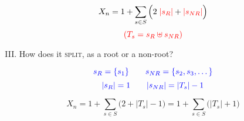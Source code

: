 
\begin{frame}{}
  \[
    X_{n} = 1 + \sum_{s \in S} \Big( 2\; \textcolor{red}{|s_{R}|} + \textcolor{red}{|s_{NR}|} \Big)
  \]
  \[
    \textcolor{red}{(T_{s} = s_{R} \uplus s_{NR})}
  \]

  \begin{enumerate}[(I)]
    \setcounter{enumi}{2}
    \centering
    \item How does it \textsc{split}, as a root or a non-root?
  \end{enumerate}

  \pause
  \[
    \textcolor{blue}{s_{R} = \{s_{1}\} \qquad s_{NR} = \{s_{2}, s_{3}, \dots\}}
  \]
  \[
    \textcolor{blue}{|s_{R}| = 1 \qquad |s_{NR}| = |T_{s}| - 1}
  \]

  \pause
  \[
    X_{n} = 1 + \sum_{s \in S} \Big(2 + |T_{s}| - 1) = 1 + \sum_{s \in S} \Big( |T_{s}| + 1 \Big)
  \]
\end{frame}
